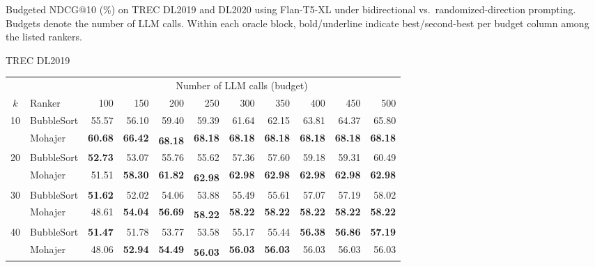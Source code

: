 \documentclass{llmxive}
\providecommand{\conv}[1]{#1\textsuperscript{\textdagger}}
\providecommand{\postconv}[1]{#1}
\providecommand{\best}[1]{\textbf{#1}}
\begin{document}
\begin{table}[!t]
\caption{
Budgeted NDCG@10 (\%) on TREC DL2019 and DL2020 using Flan-T5-XL under bidirectional vs.\ randomized-direction prompting.
Budgets denote the number of LLM calls. Within each oracle block, bold/underline indicate best/second-best per budget column among the listed rankers.
}
\label{tab:budget_ndcg10_oracles_flan_xl_by_dataset}
\caption{TREC DL2019}
\label{tab:budget_ndcg10_oracles_flan_xl_dl2019}
\end{table}
\begin{table}[!t]
\centering
\small
\begin{adjustbox}{max width=\textwidth}
\begin{tabular}{c l rrrrrrrrr}
\toprule
& & \multicolumn{9}{c}{Number of LLM calls (budget)} \\
\cmidrule(lr){3-11}
$k$ & Ranker & 100 & 150 & 200 & 250 & 300 & 350 & 400 & 450 & 500 \\
\midrule
\multirow{2}{*}{10} & BubbleSort
& 55.57 & 56.10 & 59.40 & 59.39 & 61.64 & 62.15 & 63.81 & 64.37 & 65.80 \\
& Mohajer
& \best{60.68} & \best{66.42} & \conv{\best{68.18}} & \postconv{\best{68.18}} & \postconv{\best{68.18}} & \postconv{\best{68.18}} & \postconv{\best{68.18}} & \postconv{\best{68.18}} & \postconv{\best{68.18}} \\
\midrule
\multirow{2}{*}{20} & BubbleSort
& \best{52.73} & 53.07 & 55.76 & 55.62 & 57.36 & 57.60 & 59.18 & 59.31 & 60.49 \\
& Mohajer
& 51.51 & \best{58.30} & \best{61.82} & \conv{\best{62.98}} & \postconv{\best{62.98}} & \postconv{\best{62.98}} & \postconv{\best{62.98}} & \postconv{\best{62.98}} & \postconv{\best{62.98}} \\
\midrule
\multirow{2}{*}{30} & BubbleSort
& \best{51.62} & 52.02 & 54.06 & 53.88 & 55.49 & 55.61 & 57.07 & 57.19 & 58.02 \\
& Mohajer
& 48.61 & \best{54.04} & \best{56.69} & \conv{\best{58.22}} & \postconv{\best{58.22}} & \postconv{\best{58.22}} & \postconv{\best{58.22}} & \postconv{\best{58.22}} & \postconv{\best{58.22}} \\
\midrule
\multirow{2}{*}{40} & BubbleSort
& \best{51.47} & 51.78 & 53.77 & 53.58 & 55.17 & 55.44 & \best{56.38} & \best{56.86} & \best{57.19} \\
& Mohajer
& 48.06 & \best{52.94} & \best{54.49} & \conv{\best{56.03}} & \postconv{\best{56.03}} & \postconv{\best{56.03}} & \postconv{56.03} & \postconv{56.03} & \postconv{56.03} \\

\end{tabular}
\end{adjustbox}
\end{table}
\end{document}
